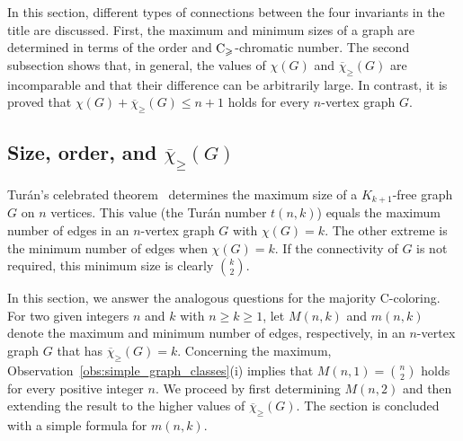 \documentclass{article}
\theoremstyle{definition}
\newcommand{\mc}{\overline{\chi}_{\geqslant}}
\newcommand{\cg}{{\rm C}_{\geqslant}}
\begin{document}
In this section, different types of connections between the four invariants in the title are discussed. First, the maximum and minimum sizes of a graph are determined in terms of the order and $\cg$-chromatic number. The second subsection shows that, in general, the values of $\chi(G)$ and $\mc(G)$ are incomparable and that their difference can be arbitrarily large. In contrast, it is proved that  $\chi(G) + \mc(G) \leq n +1$ holds for every $n$-vertex graph $G$.

\subsection{Size, order, and $\mc(G)$} \label{subsec:size-order-mc}

   Tur\'an's celebrated theorem~\cite{Turan} determines the maximum size of a $K_{k+1}$-free graph $G$ on $n$ vertices. This value (the Tur\'an number $t(n,k)$) equals the maximum number of edges in an $n$-vertex graph $G$ with $\chi(G)=k$. The other extreme is the minimum number of edges when $\chi(G)=k$. If the connectivity of $G$ is not required, this minimum size is clearly ${k \choose 2}$. 

   In this section, we answer the analogous questions for the majority C-coloring. For two given integers $n$ and $k$ with $n \ge k \ge 1$, let $M(n,k)$ and $m(n,k)$ denote the maximum and minimum number of edges, respectively, in an $n$-vertex graph $G$ that has $\mc(G)=k$. Concerning the maximum, Observation~\ref{obs:simple_graph_classes}(i) implies that $M(n,1)= {n \choose 2}$ holds for every positive integer $n$. 
   We proceed by first determining $M(n,2)$ and then extending the result to the higher values of $\mc(G)$. The section is concluded with a simple formula for $m(n,k)$.
\end{document}
